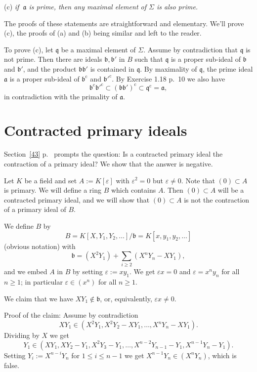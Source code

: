 \documentclass[12pt]{article}
\newcommand{\oo}{\operatorname}
\newcommand{\mf}{\mathfrak}
\newcommand{\aaa}{\mf a}
\newcommand{\bbb}{\mf b}
\begin{document}
(c) \emph{if $\ \aaa$ is prime, then any maximal element of $\Sigma$ is also prime.}

The proofs of these statements are straightforward and elementary. We'll prove (c), the proofs of (a) and (b) being similar and left to the reader.

To prove (c), let $\mf q$ be a maximal element of $\Sigma$. Assume by contradiction that $\mf q$ is not prime. Then there are ideals $\mf{b,b}'$ in $B$ such that $\mf q$ is a proper sub-ideal of $\bbb$ and $\bbb'$, and the product $\mf{bb}'$ is contained in $\mf q$. By maximality of $\mf q$, the prime ideal $\aaa$ is a proper sub-ideal of $\bbb^{\oo c}$ and $\bbb'^{\oo c}$. By Exercise 1.18 p.~10 we also have 
$$
\bbb^{\oo c}\bbb'^{\oo c}\subset(\mf{bb}')^{\oo c}\subset\mf q^{\oo c}=\aaa,
$$ 
in contradiction with the primality of $\aaa$.

\section{Contracted primary ideals}\label{cpi}%

Section~\ref{43} p.~\pageref{43} prompts the question: Is a contracted primary ideal the contraction of a primary ideal? We show that the answer is negative.


Let $K$ be a field and set $A:=K[\varepsilon]$ with $\varepsilon^2=0$ but $\varepsilon\ne0$. Note that $(0)\subset A$ is primary. We will define a ring $B$ which contains $A$. Then $(0)\subset A$ will be a contracted primary ideal, and we will show that $(0)\subset A$ is not the contraction of a primary ideal of $B$. 

We define $B$ by 
$$
B=K[X,Y_1,Y_2,\dots]/\mathfrak b=K[x,y_1,y_2,\dots]
$$ 
(obvious notation) with 
$$
\mathfrak b=(X^2Y_1)+\sum_{i\ge2}(X^nY_n-XY_1),
$$
and we embed $A$ in $B$ by setting $\varepsilon:=xy_1$. We get $\varepsilon x=0$ and $\varepsilon=x^ny_n$ for all $n\ge1$; in particular $\varepsilon\in(x^n)$ for all $n\ge1$.

We claim that we have $XY_1\notin\mathfrak b$, or, equivalently, $\varepsilon x\ne0$.

Proof of the claim: Assume by contradiction 
$$
XY_1\in(X^2Y_1,X^2Y_2-XY_1,\dots,X^nY_n-XY_1).
$$ 
Dividing by $X$ we get 
$$
Y_1\in(XY_1,XY_2-Y_1,X^2Y_3-Y_1,\dots,X^{n-2}Y_{n-1}-Y_1,X^{n-1}Y_n-Y_1).
$$ 
Setting $Y_i:=X^{n-i}Y_n$ for $1\le i\le n-1$ we get $X^{n-1}Y_n\in(X^nY_n)$, which is false. 
\end{document}
